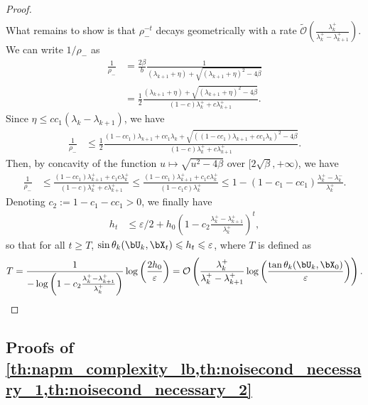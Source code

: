 \documentclass{article}
\theoremstyle{plain}
\theoremstyle{definition}
\theoremstyle{remark}
\begin{document}
\begin{proof}
\begin{align}
  \end{align}
  What remains to show is that $\rho_-^{-t}$ decays geometrically with a rate $\tilde{\mathcal{O}}\left(\frac{\lambda_k^+}{\lambda_k^+ - \lambda_{k+1}^+}\right)$. We can write $1/\rho_-$ as
  \begin{align*}
    \frac{1}{\rho_-} & = \frac{2\beta}{b}\frac{1}{(\lambda_{k+1} + \eta) + \sqrt{(\lambda_{k+1} + \eta)^2 - 4\beta}}\\
    &  = \frac{1}{2}\frac{(\lambda_{k+1} + \eta) + \sqrt{(\lambda_{k+1} + \eta)^2 - 4\beta}}{(1-c)\lambda_k^+ + c\lambda_{k+1}^+}.
  \end{align*}
  Since $\eta \leqslant cc_1(\lambda_k - \lambda_{k+1})$, we have
  \begin{align*}
    \frac{1}{\rho_-} & \leqslant \frac{1}{2}\frac{(1-cc_1)\lambda_{k+1} + cc_1\lambda_k + \sqrt{((1-cc_1)\lambda_{k+1} + cc_1\lambda_k)^2 - 4\beta}}{(1-c)\lambda_k^+ + c\lambda_{k+1}^+}.
  \end{align*}
  Then, by concavity of the function $u \mapsto \sqrt{u^2 - 4\beta}$ over $[2\sqrt{\beta}, +\infty)$, we have
  \begin{align*}
    \frac{1}{\rho_-} & \leqslant \frac{(1-cc_1)\lambda_{k+1}^+ + c_1 c \lambda_k^+}{(1-c) \lambda_k^+ + c\lambda_{k+1}^+} \leqslant \frac{(1-cc_1)\lambda_{k+1}^+ + c_1 c \lambda_k^+}{(1-c_1c)\lambda_k^+} \leqslant 1 - (1-c_1-cc_1) \frac{\lambda_k^+ - \lambda_k^-}{\lambda_k^+}.
  \end{align*}
  Denoting $c_2 := 1 - c_1 - cc_1 > 0$, we finally have
  \begin{align*}
    h_t & \leqslant \varepsilon/2 + h_0 \left(1 - c_2 \frac{\lambda_k^+ - \lambda_{k+1}^+}{\lambda_k^+}\right)^t,
  \end{align*}
  so that for all $t \geqslant T$, $\sin \theta_k(\bU_k, \bX_t) \leqslant h_t \leqslant \varepsilon$, where $T$ is defined as 
  \begin{align*}
    T = \frac{1}{- \log\left(1 - c_2 \frac{\lambda_k^+ - \lambda_{k+1}^+}{\lambda_k^+}\right)} \log\left(\frac{2h_0}{\varepsilon} \right)= \mathcal{O}\left({\frac{\lambda_k^+}{\lambda_k^+ - \lambda_{k+1}^+}} \log\left(\frac{\tan\theta_k(\bU_k, \bX_0)}{\varepsilon}\right)\right).
  \end{align*}

\end{proof}

\subsection{Proofs of \cref{th:napm_complexity_lb,th:noisecond_necessary_1,th:noisecond_necessary_2}}\label{apdx:napm_opt_proofs}
\end{document}
